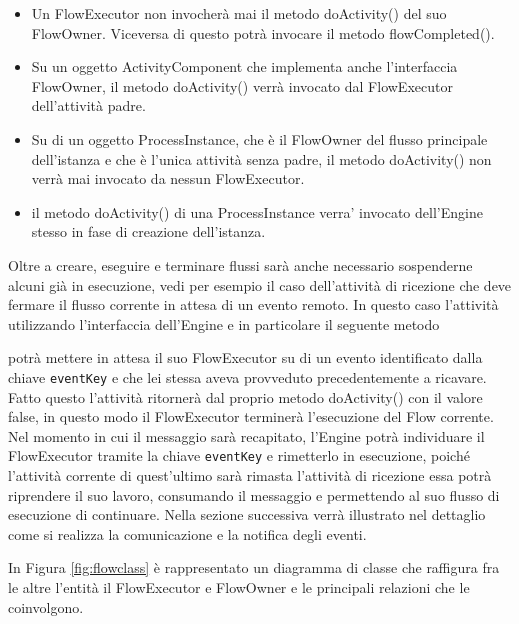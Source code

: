 \begin{itemize}
  \item Un FlowExecutor non invocherà mai il metodo doActivity() del suo
  FlowOwner. Viceversa di questo potrà invocare il metodo
  flowCompleted().
  
  \item Su un oggetto ActivityComponent che implementa anche l'interfaccia
  FlowOwner, il metodo doActivity() verrà invocato dal FlowExecutor dell'attività 
  padre.
  
  \item Su di un oggetto ProcessInstance, che \`e il FlowOwner del flusso
  principale dell'istanza e che \`e l'unica attività senza padre, 
  il metodo doActivity() non verrà mai invocato da nessun FlowExecutor.
  
  \item il metodo doActivity() di una ProcessInstance verra' invocato
  dell'Engine stesso in fase di creazione dell'istanza.
  
\end{itemize}

Oltre a creare, eseguire e terminare flussi sarà anche necessario sospenderne
alcuni già in esecuzione, vedi per esempio il caso dell'attività di ricezione
che deve fermare il flusso corrente in attesa di un evento remoto. In questo
caso l'attività utilizzando l'interfaccia dell'Engine e in particolare il
seguente metodo



potrà mettere in attesa il suo FlowExecutor su di un evento identificato dalla
chiave \texttt{eventKey} e che lei stessa aveva provveduto
precedentemente a ricavare. Fatto questo l'attività ritornerà dal proprio metodo
doActivity() con il valore false, in questo modo il FlowExecutor terminerà
l'esecuzione del Flow corrente. Nel momento in cui il messaggio sarà recapitato,
l'Engine potrà individuare il FlowExecutor tramite la chiave \texttt{eventKey} e
rimetterlo in esecuzione, poiché l'attività corrente di quest'ultimo sarà rimasta
l'attività di ricezione essa potrà riprendere il suo lavoro, consumando il
messaggio e permettendo al suo flusso di esecuzione di continuare. Nella sezione
successiva verrà illustrato nel dettaglio come si realizza la comunicazione e la
notifica degli eventi.

In Figura \ref{fig:flowclass} \`e rappresentato un diagramma di classe che
raffigura fra le altre l'entità il FlowExecutor e FlowOwner e le principali
relazioni che le coinvolgono.

